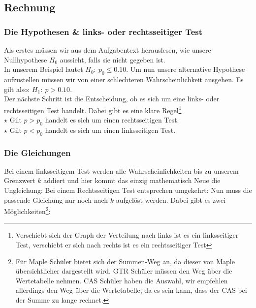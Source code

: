 \subsection{Rechnung}
	\subsubsection{Die Hypothesen \& links- oder rechtsseitiger Test}
		Als erstes müssen wir aus dem Aufgabentext herauslesen, wie unsere
		Nullhypothese \(H_0\) aussieht, falls sie nicht gegeben ist.\\
		In unserem Beispiel lautet \(H_0:\ p_0\leq 0.10\). Um nun unsere alternative
		Hypothese aufzustellen müssen wir von einer schlechteren Wahrscheinlichkeit
		ausgehen. Es gilt also: \(H_1:\ p>0.10\).\\
		Der nächste Schritt ist die Entscheidung, ob es sich um eine links- oder
		rechtsseitigen Test handelt. Dabei gibt es eine klare
		Regel\footnote{Verschiebt sich der Graph der Verteilung nach links ist es ein
		linksseitiger Test, verschiebt er sich nach rechts ist es ein rechtsseitiger
		Test}\\
		\(\star\) Gilt \(p>p_0\) handelt es sich um einen rechtsseitigen Test.\\
		\(\star\) Gilt \(p<p_0\) handelt es sich um einen linksseitigen Test.\\
	
	\subsubsection{Die Gleichungen}
		Bei einem linksseitigem Test werden alle Wahrscheinlichkeiten bis zu unserem
		Grenzwert \(k\) addiert und hier kommt das einzig mathematisch Neue die
		Ungleichung:
		\formel{\[P(X\geq k)=B(n,p_0,0)+B(n,p_0,1)+\ldots+B(n,p_0,k) \leq \alpha\]}
		Bei einem Rechtsseitigen Test entsprechen umgekehrt:
		\formel{\[P(X\leq k)=B(n,p_0,k)+B(n,p_0,k+1)+\ldots+B(n,p_0,n) \leq \alpha\]}
		Nun muss die passende Gleichung nur noch nach \(k\) aufgelöst werden. Dabei
		gibt es zwei Möglichkeiten\footnote{Für Maple Schüler bietet sich der Summen-Weg
		an, da dieser von Maple übersichtlicher dargestellt wird. GTR Schüler müssen
		den Weg über die Wertetabelle nehmen. CAS Schüler haben die Auswahl, wir
		empfehlen allerdings den Weg über die Wertetabelle, da es sein kann, dass der
		CAS bei der Summe zu lange rechnet.}:\\

